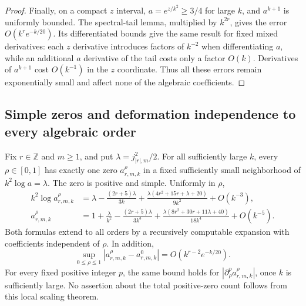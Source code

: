 \begin{proof}
Finally, on a compact $z$ interval, $a=e^{z/k^2}\geq3/4$ for
large $k$, and $a^{k+1}$ is uniformly bounded. The spectral-tail
lemma, multiplied by $k^{2r}$, gives the error
$O(k^r e^{-k/20})$. Its differentiated bounds give the same result
for fixed mixed derivatives: each $z$ derivative introduces factors
of $k^{-2}$ when differentiating $a$, while an additional $a$
derivative of the tail costs only a factor $O(k)$. Derivatives of
$a^{k+1}$ cost $O(k^{-1})$ in the $z$ coordinate. Thus all these
errors remain exponentially small and affect none of the algebraic
coefficients.
\end{proof}

\subsection{Simple zeros and deformation independence to every algebraic order}

\begin{theorem}
\label{bessel:thm:zeros}
Fix $r\in\mathbb Z$ and $m\geq1$, and put
$\lambda=j_{|r|,m}^2/2$. For all sufficiently large $k$, every
$\rho\in[0,1]$ has exactly one zero $a_{r,m,k}^{\rho}$ in a
fixed sufficiently small neighborhood of $k^2\log a=\lambda$.
The zero is positive and simple. Uniformly in $\rho$,
\begin{align}\label{bessel:eq:zerosz}
 k^2\log a_{r,m,k}^{\rho}
 &=\lambda-\frac{(2r+5)\lambda}{3k}
       +\frac{\lambda(4r^2+15r+\lambda+20)}{9k^2}
       +O(k^{-3}),\\
 a_{r,m,k}^{\rho}
 &=1+\frac\lambda{k^2}-\frac{(2r+5)\lambda}{3k^3}
       +\frac{\lambda(8r^2+30r+11\lambda+40)}{18k^4}
       +O(k^{-5}).\label{bessel:eq:zerosa}
\end{align}
Both formulas extend to all orders by a recursively computable
expansion with coefficients independent of $\rho$. In addition,
\begin{equation}\label{bessel:eq:deformation}
 \sup_{0\leq\rho\leq1}
 |a_{r,m,k}^{\rho}-a_{r,m,k}^{0}|
       =O(k^{r-2}e^{-k/20}).
\end{equation}
For every fixed positive integer $p$, the same bound holds for
$|\partial_\rho^p a_{r,m,k}^{\rho}|$, once $k$ is sufficiently large.
No assertion about the total positive-zero count follows from this
local scaling theorem.
\end{theorem}


